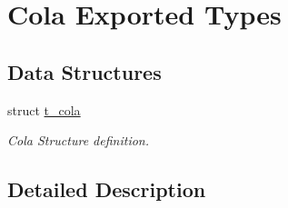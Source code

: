 \hypertarget{group___cola___exported___types}{}\section{Cola Exported Types}
\label{group___cola___exported___types}
\subsection*{Data Structures}
\begin{DoxyCompactItemize}
\item 
struct \hyperlink{structt__cola}{t\+\_\+cola}
\begin{DoxyCompactList}\small\item\em Cola Structure definition. \end{DoxyCompactList}\end{DoxyCompactItemize}


\subsection{Detailed Description}
